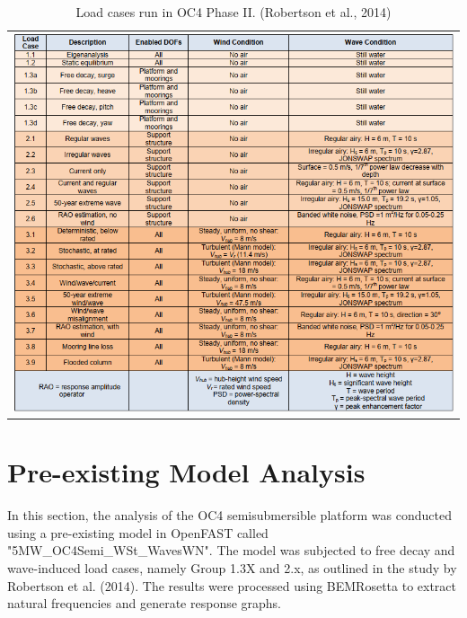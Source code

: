 \documentclass[a4paper, 11pt]{article}
\begin{document}
\begin{table}[H]
    \centering
    \caption{Load cases run in OC4 Phase II. (Robertson et al., 2014)}
    \label{tab:image_table}
    \begin{tabular}{c}
        \includegraphics[width=1\textwidth]{table_3.png} \\
    \end{tabular}
\end{table}


\section{Pre-existing Model Analysis}

\hspace*{0.5cm}In this section, the analysis of the OC4 semisubmersible platform was conducted using a pre-existing model in OpenFAST called "5MW\_OC4Semi\_WSt\_WavesWN". The model was subjected to free decay and wave-induced load cases, namely Group 1.3X and 2.x, as outlined in the study by Robertson et al. (2014). The results were processed using BEMRosetta to extract natural frequencies and generate response graphs.
\end{document}
